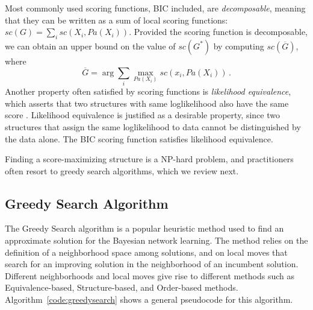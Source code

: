 Most commonly used scoring functions, BIC included, are \emph{decomposable}, meaning
that they can be written as a sum of local scoring functions:
${sc}(G)=\sum_i {sc}(X_i, {Pa}(X_i))$. Provided the scoring function is decomposable, we can obtain an upper bound on the value of $sc(G^*)$ by computing $sc(\overline{G})$, where
\begin{equation} \label{upperbound}
 \overline{G} = \arg \sum_i \max_{{Pa}(X_i)} sc( x_i, {Pa}( X_i ) ) \, . 
\end{equation}
Another property often satisfied by scoring functions is
\emph{likelihood equivalence}, which asserts that two structures with
same loglikelihood also have the same score \cite{Maxwell04}. Likelihood
equivalence is justified as a desirable property, since two structures
that assign the same loglikelihood to data cannot be distinguished by
the data alone. The BIC scoring function satisfies likelihood
equivalence.

Finding a score-maximizing structure is a NP-hard problem, and practitioners often resort to greedy search algorithms, which we review next.

\subsection{Greedy Search Algorithm}
\label{subsec:greedysearch}

The Greedy Search algorithm is a popular heuristic method used to find an approximate solution for the Bayesian network learning. The method relies on the definition of a neighborhood space among solutions, and on local moves that search for an improving solution in the neighborhood of an incumbent solution. Different neighborhoods and local moves give rise to different methods such as Equivalence-based, Structure-based,  and Order-based methods. Algorithm~\ref{code:greedysearch} shows a general pseudocode for this algorithm.

